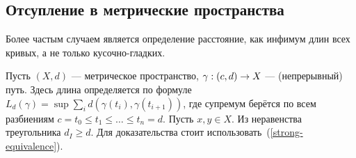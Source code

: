 \documentclass[a4paper]{report}
\begin{document}
    \subsection{Отсупление в метрические пространства}
    Более частым случаем является определение расстояние, как инфимум длин всех кривых, а не только кусочно-гладких.

    Пусть $(X, d)$ --- метрическое пространство, $\gamma: (c, d) \rightarrow X$ --- (непрерывный) путь.
    Здесь длина определяется по формуле $L_d(\gamma) = \sup\sum\limits_{i}d(\gamma(t_i), \gamma(t_{i+1}))$, где супремум берётся по всем разбиениям $c = t_0 \le t_1 \le \dots \le t_n = d$.
    Пусть $x, y \in X$.
    Из неравенства треугольника $d_I \ge d$.
    Для доказательства стоит использовать~(\cref{strong-equivalence}).
\end{document}
